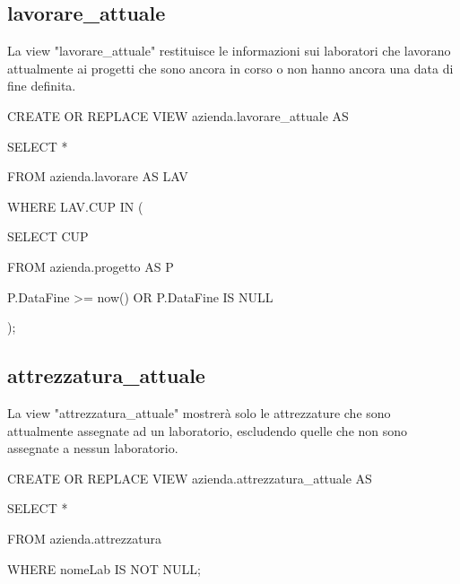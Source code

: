         \subsection{lavorare\_attuale  }
        La view "lavorare\_attuale" restituisce le informazioni sui laboratori che lavorano attualmente ai progetti che sono ancora in corso o non hanno ancora una data di fine definita.
            \ttfamily
                \begin{flushleft}
                    \begin{description}
                        \item CREATE OR REPLACE VIEW azienda.lavorare\_attuale AS
                        \item SELECT *       
                        \item FROM azienda.lavorare AS LAV
                        \item WHERE LAV.CUP IN (
                        \begin{description}
                            \item SELECT CUP
                            \item FROM azienda.progetto AS P
                            \item P.DataFine >= now() OR P.DataFine IS NULL
                        \end{description}
                    );
                \end{description}
            \end{flushleft}
        \normalfont


        \subsection{attrezzatura\_attuale}
        La view "attrezzatura\_attuale" mostrerà solo le attrezzature che sono attualmente assegnate ad un laboratorio, escludendo quelle che non sono assegnate a nessun laboratorio.
        \ttfamily
            \begin{flushleft}
                \begin{description}
                    \item CREATE OR REPLACE VIEW azienda.attrezzatura\_attuale AS
                    \item SELECT *       
                    \item FROM azienda.attrezzatura
                    \item WHERE nomeLab IS NOT NULL;
                \end{description}
            \end{flushleft}
        \normalfont

